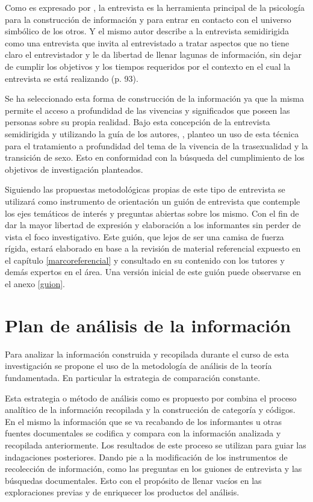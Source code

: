 Como es expresado por \textcite{Colin1999}, la entrevista es la herramienta
principal de la psicología para la construcción de información y para entrar en
contacto con el universo simbólico de los otros. Y el mismo autor describe a la
entrevista semidirigida como una entrevista que invita al entrevistado a tratar
aspectos que no tiene claro el entrevistador y le da libertad de llenar lagunas
de información, sin dejar de cumplir los objetivos y los tiempos requeridos por
el contexto en el cual la entrevista se está realizando (p. 93).

Se ha seleccionado esta forma de construcción de la información ya que la misma
permite el acceso a profundidad de las vivencias y significados que poseen las
personas sobre su propia realidad. Bajo esta concepción de la entrevista
semidirigida y utilizando la guía de los autores,
\textcites{Colin1999}{Hidalgo2005}{Perpina2014}, planteo un uso de esta técnica
para el tratamiento a profundidad del tema de la vivencia de la trasexualidad y
la transición de sexo. Esto en conformidad con la búsqueda del cumplimiento de
los objetivos de investigación planteados.

Siguiendo las propuestas metodológicas propias de este tipo de entrevista se
utilizará como instrumento de orientación un guión de entrevista que contemple
los ejes temáticos de interés y preguntas abiertas sobre los mismo. Con el fin
de dar la mayor libertad de expresión y elaboración a los informantes sin perder
de vista el foco investigativo. Este guión, que lejos de ser una camisa de
fuerza rígida, estará elaborado en base a la revisión de material referencial
expuesto en el capítulo \ref{marcoreferencial} y consultado en su contenido con
los tutores y demás expertos en el área. Una versión inicial de este guión puede observarse en el anexo \ref{guion}.

\section{Plan de análisis de la información}

	Para analizar la información construida y recopilada durante el curso de esta
investigación se propone el uso de la metodología de análisis de la teoría
fundamentada. En particular la estrategia de comparación constante.

	Esta estrategia o método de análisis como es propuesto por \textcite[][p.
102]{Glaser1967} combina el proceso analítico de la información recopilada y la
construcción de categoría y códigos. En el mismo la información que se va
recabando de los informantes u otras fuentes documentales se codifica y compara
con la información analizada y recopilada anteriormente. Los resultados de este
proceso se utilizan para guiar las indagaciones posteriores. Dando pie a la
modificación de los instrumentos de recolección de información, como las
preguntas en los guiones de entrevista y las búsquedas documentales. Esto con el
propósito de llenar vacíos en las exploraciones previas y de enriquecer los
productos del análisis.
	
